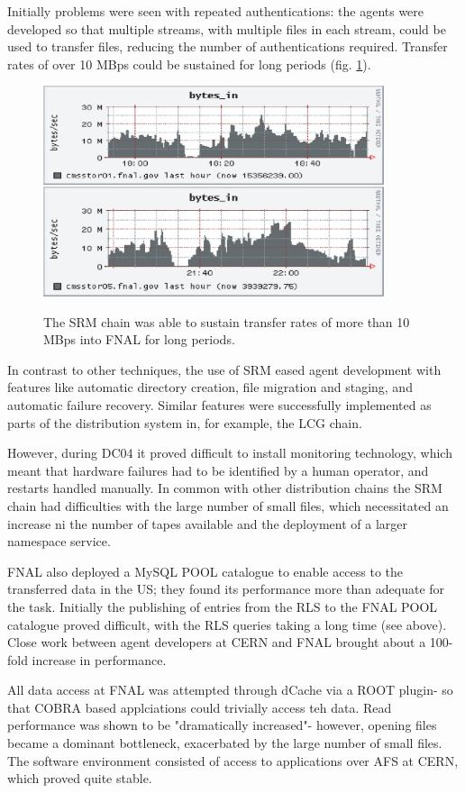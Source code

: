 \documentclass{cmspaper}
\begin{document}
Initially problems were seen with repeated authentications: the agents were developed so that multiple streams, with multiple files in each stream, could be used to transfer files, reducing the number of authentications required. Transfer rates of over 10 MBps could be sustained for long periods (fig. \ref{fig:FNAL-network}).

\begin{figure}[tbp]
\centering
\includegraphics[width=10cm]{FNAL-network.eps}
\label{fig:FNAL-network}
\caption{The SRM chain was able to sustain transfer rates of more than 10 MBps into FNAL for long periods.}
\end{figure} 

In contrast to other techniques, the use of SRM eased agent development with features like automatic directory creation, file migration and staging, and automatic failure recovery. Similar features were successfully implemented as parts of the distribution system in, for example, the LCG chain.

However, during DC04 it proved difficult to install monitoring technology, which meant that hardware failures had to be identified by a human operator, and restarts handled manually. In common with other distribution chains the SRM chain had difficulties with the large number of small files, which necessitated an increase ni the number of tapes available and the deployment of a larger namespace service.

FNAL also deployed a MySQL POOL catalogue to enable access to the transferred data in the US; they found its performance more than adequate for the task. Initially the publishing of entries from the RLS to the FNAL POOL catalogue proved difficult, with the RLS queries taking a long time (see above). Close work between agent developers at CERN and FNAL brought about a 100-fold increase in performance.

All data access at FNAL was attempted through dCache via a ROOT plugin- so that COBRA based applciations could trivially access teh data. Read performance was shown to be "dramatically increased"- however, opening files became a dominant bottleneck, exacerbated by the large number of small files. The software environment consisted of access to applications over AFS at CERN, which proved quite stable.
\end{document}
